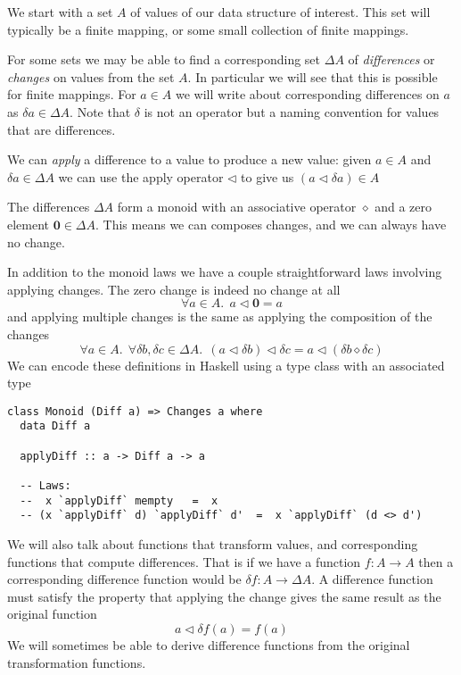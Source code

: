 \documentclass[11pt,a4paper]{article}
\begin{document}
We start with a set $A$ of values of our data structure of interest. This set
will typically be a finite mapping, or some small collection of finite mappings.

For some sets we may be able to find a corresponding set $\Delta{A}$ of
\emph{differences} or \emph{changes} on values from the set $A$. In particular
we will see that this is possible for finite mappings. For $a \in A$ we will
write about corresponding differences on $a$ as $\delta{a} \in \Delta{A}$.
Note that $\delta$ is not an operator but a naming convention for values that
are differences.

We can \emph{apply} a difference to a value to produce a new value: given
$a \in A$ and $\delta{a} \in \Delta{A}$ we can use the apply operator
$\triangleleft$ to give us $(a \triangleleft \delta{a}) \in A$

The differences $\Delta{A}$ form a monoid with an associative operator
$\diamond$ and a zero element $\mathbf{0} \in \Delta{A}$. This means we can
composes changes, and we can always have no change.

In addition to the monoid laws we have a couple straightforward laws involving
applying changes. The zero change is indeed no change at all
\begin{equation}
  \forall a \in A. ~~ a \triangleleft \mathbf{0} = a
\end{equation}
and applying multiple changes is the same as applying the composition of the
changes
\begin{equation}
\label{eq:apply-compose}
  \forall a \in A. ~~ \forall \delta{b}, \delta{c} \in \Delta{A}. ~~
    (a \triangleleft \delta{b}) \triangleleft \delta{c}
  = a \triangleleft (\delta{b} \diamond \delta{c})
\end{equation}
We can encode these definitions in Haskell using a type class with an associated
type
\begin{verbatim}
class Monoid (Diff a) => Changes a where
  data Diff a

  applyDiff :: a -> Diff a -> a

  -- Laws:
  --  x `applyDiff` mempty   =  x
  -- (x `applyDiff` d) `applyDiff` d'  =  x `applyDiff` (d <> d')
\end{verbatim}

We will also talk about functions that transform values, and corresponding
functions that compute differences. That is if we have a function $f : A \to A$
then a corresponding difference function would be $\delta{f} : A \to \Delta{A}$.
A difference function must satisfy the property that applying the change gives
the same result as the original function
\begin{equation}
  a \triangleleft \delta{f}(a) = f(a)
\end{equation}
We will sometimes be able to derive difference functions from the original
transformation functions.
\end{document}
